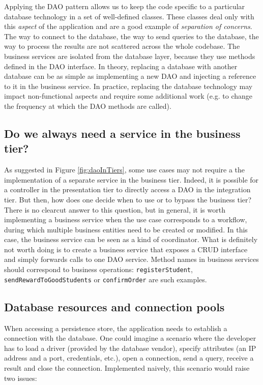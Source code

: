 Applying the \ac{DAO} pattern allows us to keep the code specific to a particular database technology in a set of well-defined classes. These classes deal only with this \emph{aspect} of the application and are a good example of \emph{separation of concerns}. The way to connect to the database, the way to send queries to the database, the way to process the results are not scattered across the whole codebase. The business services are isolated from the database layer, because they use methods defined in the \ac{DAO} interface. In theory, replacing a database with another database can be as simple as implementing a new \ac{DAO} and injecting a reference to it in the business service. In practice, replacing the database technology may impact non-functional aspects and require some additional work (e.g. to change the frequency at which the \ac{DAO} methods are called).

\subsection{Do we always need a service in the business tier?}

As suggested in Figure \ref{fig:daoInTiers}, some use cases may not require a the implementation of a separate service in the business tier. Indeed, it is possible for a controller in the presentation tier to directly access a \ac{DAO} in the integration tier. But then, how does one decide when to use or to bypass the business tier? There is no clearcut answer to this question, but in general, it is worth implementing a business service when the use case corresponds to a workflow, during which multiple business entities need to be created or modified. In this case, the business service can be seen as a kind of coordinator. What is definitely not worth doing is to create a business service that exposes a \ac{CRUD} interface and simply forwards calls to one \ac{DAO} service. Method names in business services should correspond to business operations: \texttt{registerStudent}, \texttt{sendRewardToGoodStudents} or \texttt{confirmOrder} are such examples.

\subsection{Database resources and connection pools}

When accessing a persistence store, the application needs to establish a connection with the database. One could imagine a scenario where the developer has to load a driver (provided by the database vendor), specify attributes (an IP address and a port, credentials, etc.), open a connection, send a query, receive a result and close the connection. Implemented naively, this scenario would raise two issues:

